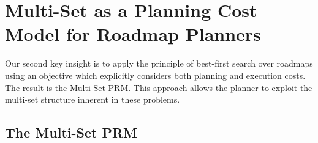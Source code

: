 %
%
%
%
%
%
%
%
%
%
%
%




\section{Multi-Set as a Planning Cost Model for Roadmap Planners}
\label{chap:multi-set-prm}

Our second key insight
is to apply the principle of best-first search over roadmaps
using an objective which explicitly considers both planning and
execution costs.
The result is the Multi-Set PRM.
This approach allows the planner to exploit the multi-set structure
inherent in these problems.

\subsection{The Multi-Set PRM}


